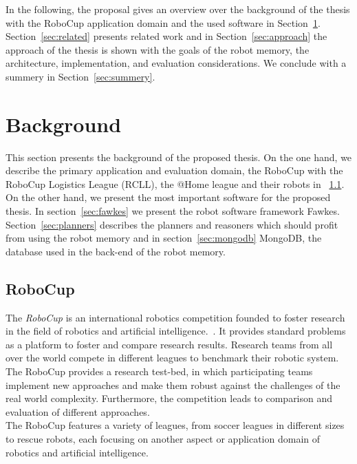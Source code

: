 \documentclass[a4paper,11pt]{article}
\newcommand{\refsec}[1]{Section~\ref{#1}}
\begin{document}
In the following, the proposal gives an overview over the background
of the thesis with the RoboCup application domain and the used
software in \refsec{sec:background}. \refsec{sec:related} presents
related work and in \refsec{sec:approach} the approach of the thesis
is shown with the goals of the robot memory, the architecture,
implementation, and evaluation considerations. We conclude with a
summery in \refsec{sec:summery}.


\section{Background}
\label{sec:background}
This section presents the background of the proposed thesis. On the
one hand, we describe the primary application and evaluation domain,
the RoboCup with the RoboCup Logistics League (RCLL), the @Home league
and their robots in ~\ref{sec:robocup}. On the other hand, we present
the most important software for the proposed thesis. In
section~\ref{sec:fawkes} we present the robot software framework
Fawkes. Section~\ref{sec:planners} describes the planners and
reasoners which should profit from using the robot memory and in
section~\ref{sec:mongodb} MongoDB, the database used in the back-end of
the robot memory.

\subsection{RoboCup}
\label{sec:robocup}
The
\emph{RoboCup} is an international robotics competition founded to
foster research in the field of robotics and artificial
intelligence.~\cite{RoboCup-Paper}. It provides standard problems as a
platform to foster and compare research results. Research
teams from all over the world compete in different leagues to
benchmark their robotic system. The RoboCup provides a research
test-bed, in which participating teams implement new approaches and
make them robust against the challenges of the real world
complexity. Furthermore, the competition leads to comparison and
evaluation of different approaches.\\
%
The RoboCup features a variety of leagues, from soccer leagues in
different sizes to rescue robots, each focusing on another aspect or
application domain of robotics and artificial intelligence.
\end{document}

